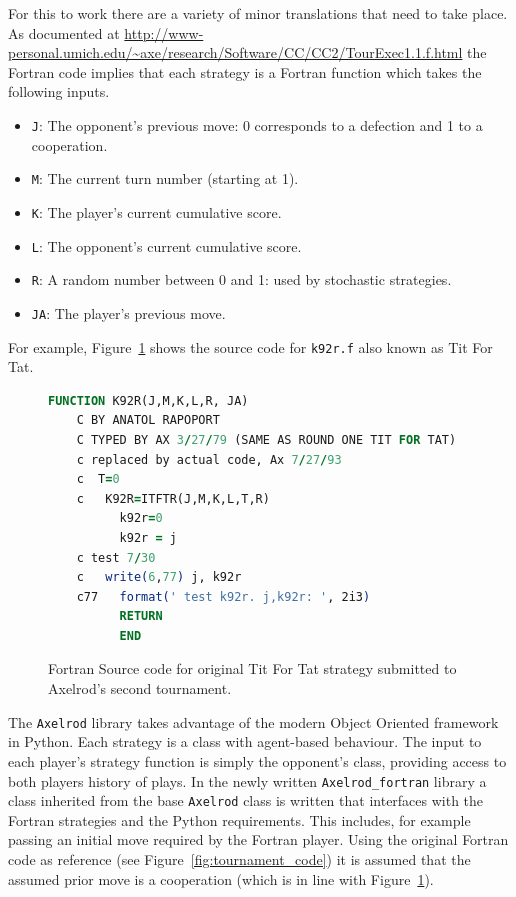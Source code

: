 \documentclass{article}
\begin{document}
For this to work there are a variety of minor translations that need to take
place. As documented at
\url{http://www-personal.umich.edu/~axe/research/Software/CC/CC2/TourExec1.1.f.html}
the Fortran code implies that each strategy is a Fortran function which takes
the following inputs.

\begin{itemize}
    \item  \texttt{J}: The opponent's previous move: 0 corresponds to a
        defection and 1 to a cooperation.
    \item \texttt{M}: The current turn number (starting at 1).
    \item \texttt{K}: The player's current cumulative score.
    \item \texttt{L}: The opponent's current cumulative score.
    \item \texttt{R}: A random number between 0 and 1: used by stochastic
        strategies.
    \item \texttt{JA}: The player's previous move.
\end{itemize}

For example, Figure~\ref{fig:tft_fortran} shows the source code for
\texttt{k92r.f} also known as Tit For Tat.

\begin{figure}[!hbtp]
    \begin{center}
        \begin{lstlisting}[language=Fortran,
                           basicstyle=\ttfamily,
                           frame=single,
                           keywordstyle=\color{red},
                           commentstyle=\color{green}]
          FUNCTION K92R(J,M,K,L,R, JA)
    C BY ANATOL RAPOPORT
    C TYPED BY AX 3/27/79 (SAME AS ROUND ONE TIT FOR TAT)
    c replaced by actual code, Ax 7/27/93
    c  T=0
    c   K92R=ITFTR(J,M,K,L,T,R)
          k92r=0
          k92r = j
    c test 7/30
    c   write(6,77) j, k92r
    c77   format(' test k92r. j,k92r: ', 2i3)
          RETURN
          END
        \end{lstlisting}
        \caption{Fortran Source code for original Tit For Tat strategy submitted
        to Axelrod's second tournament.}
        \label{fig:tft_fortran}
    \end{center}
\end{figure}

The \texttt{Axelrod} library takes advantage of the modern Object Oriented
framework in Python. Each strategy is a class with agent-based behaviour. The
input to each player's strategy function is simply the opponent's class, providing access to
both players history of plays. In the newly written \texttt{Axelrod\_fortran} library a
class inherited from the base \texttt{Axelrod} class is written that interfaces
with the Fortran strategies and the Python requirements. This includes, for
example passing an initial move required by the Fortran player. Using the
original Fortran code as reference (see Figure~\ref{fig:tournament_code}) it
is assumed that the assumed prior move is
a cooperation (which is in line with Figure~\ref{fig:tft_fortran}).
\end{document}
